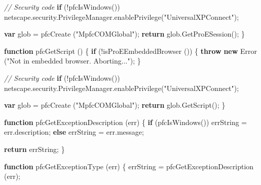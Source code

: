 \documentclass[]{article}
\newenvironment{Shaded}{}{}
\newcommand{\KeywordTok}[1]{\textcolor[rgb]{0.00,0.44,0.13}{\textbf{{#1}}}}
\newcommand{\StringTok}[1]{\textcolor[rgb]{0.25,0.44,0.63}{{#1}}}
\newcommand{\CommentTok}[1]{\textcolor[rgb]{0.38,0.63,0.69}{\textit{{#1}}}}
\newcommand{\OtherTok}[1]{\textcolor[rgb]{0.00,0.44,0.13}{{#1}}}
\newcommand{\FunctionTok}[1]{\textcolor[rgb]{0.02,0.16,0.49}{{#1}}}
\newcommand{\NormalTok}[1]{{#1}}
\begin{document}
\begin{Shaded}
\begin{Highlighting}[]
  \CommentTok{// Security code}
  \KeywordTok{if} \NormalTok{(!}\FunctionTok{pfcIsWindows}\NormalTok{())}
    \OtherTok{netscape}\NormalTok{.}\OtherTok{security}\NormalTok{.}\OtherTok{PrivilegeManager}\NormalTok{.}\FunctionTok{enablePrivilege}\NormalTok{(}\StringTok{"UniversalXPConnect"}\NormalTok{);}
  
  \KeywordTok{var} \NormalTok{glob = }\FunctionTok{pfcCreate} \NormalTok{(}\StringTok{"MpfcCOMGlobal"}\NormalTok{);}
  \KeywordTok{return} \OtherTok{glob}\NormalTok{.}\FunctionTok{GetProESession}\NormalTok{();}
\NormalTok{\}}

\KeywordTok{function} \FunctionTok{pfcGetScript} \NormalTok{()}
\NormalTok{\{  }
  \KeywordTok{if} \NormalTok{(!}\FunctionTok{isProEEmbeddedBrowser} \NormalTok{())}
    \NormalTok{\{}
      \KeywordTok{throw} \KeywordTok{new} \FunctionTok{Error} \NormalTok{(}\StringTok{"Not in embedded browser.  Aborting..."}\NormalTok{);}
    \NormalTok{\}}
  
  \CommentTok{// Security code}
  \KeywordTok{if} \NormalTok{(!}\FunctionTok{pfcIsWindows}\NormalTok{())}
    \OtherTok{netscape}\NormalTok{.}\OtherTok{security}\NormalTok{.}\OtherTok{PrivilegeManager}\NormalTok{.}\FunctionTok{enablePrivilege}\NormalTok{(}\StringTok{"UniversalXPConnect"}\NormalTok{);}
  
  \KeywordTok{var} \NormalTok{glob = }\FunctionTok{pfcCreate} \NormalTok{(}\StringTok{"MpfcCOMGlobal"}\NormalTok{);}
  \KeywordTok{return} \OtherTok{glob}\NormalTok{.}\FunctionTok{GetScript}\NormalTok{();}
\NormalTok{\}}


\KeywordTok{function} \FunctionTok{pfcGetExceptionDescription} \NormalTok{(err)}
\NormalTok{\{}
 \KeywordTok{if} \NormalTok{(}\FunctionTok{pfcIsWindows}\NormalTok{())}
    \NormalTok{errString = }\OtherTok{err}\NormalTok{.}\FunctionTok{description}\NormalTok{;}
 \KeywordTok{else}
      \NormalTok{errString = }\OtherTok{err}\NormalTok{.}\FunctionTok{message}\NormalTok{;}

 \KeywordTok{return} \NormalTok{errString;}
\NormalTok{\}}

\KeywordTok{function} \FunctionTok{pfcGetExceptionType} \NormalTok{(err)}
\NormalTok{\{}
  \NormalTok{errString = }\FunctionTok{pfcGetExceptionDescription} \NormalTok{(err);}


\end{Highlighting}
\end{Shaded}
\end{document}
